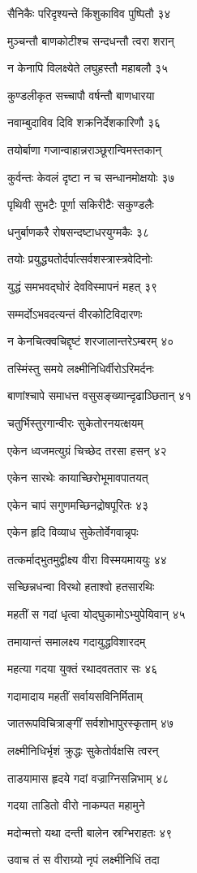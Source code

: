सैनिकैः परिदृश्यन्ते किंशुकाविव पुष्पितौ ३४

मुञ्चन्तौ बाणकोटीश्च सन्दधन्तौ त्वरा शरान्

न केनापि विलक्ष्येते लघुहस्तौ महाबलौ ३५

कुण्डलीकृत सच्चापौ वर्षन्तौ बाणधारया

नवाम्बुदाविव दिवि शक्रनिर्देशकारिणौ ३६

तयोर्बाणा गजान्वाहान्नराञ्छूरान्विमस्तकान्

कुर्वन्तः केवलं दृष्टा न च सन्धानमोक्षयोः ३७

पृथिवी सुभटैः पूर्णा सकिरीटैः सकुण्डलैः

धनुर्बाणकरै रोषसन्दष्टाधरयुग्मकैः ३८

तयोः प्रयुद्ध्यतोर्दर्पात्सर्वशस्त्रास्त्रवेदिनोः

युद्धं समभवद्घोरं देवविस्मापनं महत् ३९

सम्मर्दोऽभवदत्यन्तं वीरकोटिविदारणः

न केनचित्क्वचिद्दृष्टं शरजालान्तरेऽम्बरम् ४०

तस्मिंस्तु समये लक्ष्मीनिधिर्वीरोऽरिमर्दनः

बाणांश्चापे समाधत्त वसुसङ्ख्यान्दृढाञ्छितान् ४१

चतुर्भिस्तुरगान्वीरः सुकेतोरनयत्क्षयम्

एकेन ध्वजमत्युग्रं चिच्छेद तरसा हसन् ४२

एकेन सारथेः कायाच्छिरोभूमावपातयत्

एकेन चापं सगुणमच्छिनद्रोषपूरितः ४३

एकेन हृदि विव्याध सुकेतोर्वेगवान्नृपः

तत्कर्माद्भुतमुद्वीक्ष्य वीरा विस्मयमाययुः ४४

सच्छिन्नधन्वा विरथो हताश्वो हतसारथिः

महतीं स गदां धृत्वा योद्घुकामोऽभ्युपेयिवान् ४५

तमायान्तं समालक्ष्य गदायुद्धविशारदम्

महत्या गदया युक्तं रथादवततार सः ४६

गदामादाय महतीं सर्वायसविनिर्मिताम्

जातरूपविचित्राङ्गीं सर्वशोभापुरस्कृताम् ४७

लक्ष्मीनिधिर्भृशं क्रुद्धः सुकेतोर्वक्षसि त्वरन्

ताडयामास हृदये गदां वज्राग्निसन्निभाम् ४८

गदया ताडितो वीरो नाकम्पत महामुने

मदोन्मत्तो यथा दन्ती बालेन स्रग्भिराहतः ४९

उवाच तं स वीराग्र्यो नृपं लक्ष्मीनिधिं तदा

